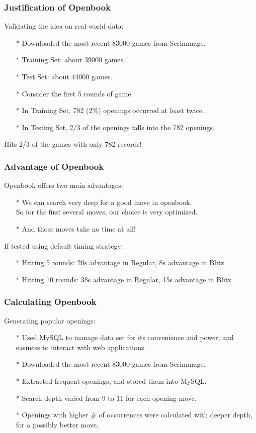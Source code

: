 \documentclass[10pt]{beamer}
\begin{document}
	\begin{frame}
		\frametitle{Justification of Openbook}
		Validating the idea on real-world data:\pause
		\begin{itemize}
		\item[*] Downloaded the most recent 83000 games from Scrimmage.
		\item[*] Training Set: about 39000 games.
		\item[*] Test Set: about 44000 games.
		\pause
		\item[*] Consider the first \textcolor{dred}{5} rounds of game.
		\item[*] In Training Set, \textcolor{fgreen}{782} (\textcolor{fgreen}{2\%}) openings occurred at least \textcolor{fgreen}{twice}.
		\item[*] In Testing Set, \textcolor{fgreen}{2/3} of the openings falls into the 782 openings.
		\end{itemize}
		\pause
		Hits \textcolor{fgreen}{2/3} of the games with only \textcolor{fgreen}{782} records!
	\end{frame}

	\begin{frame}
		\frametitle{Advantage of Openbook}
		Openbook offers two main advantages:
		\begin{itemize}
		\item[*] We can search very deep for a good move in openbook.\\
		         So for the first several moves, our choice is very optimized.
		\item[*] And those moves take no time at all!
		\end{itemize}
		\pause
		If tested using default timing strategy:
		\begin{itemize}
		\item[*] Hitting \textcolor{fgreen}{5} rounds: \textcolor{fgreen}{20s} advantage in Regular, \textcolor{fgreen}{8s} advantage in Blitz.
		\item[*] Hitting \textcolor{fgreen}{10} rounds: \textcolor{fgreen}{38s} advantage in Regular, \textcolor{fgreen}{15s} advantage in Blitz.
		\end{itemize}
	\end{frame}

	\begin{frame}
		\frametitle{Calculating Openbook}
		Generating popular openings:
		\begin{itemize}
		\item[*] Used MySQL to manage data set for its convenience and power,
		and easiness to interact with web applications.
		\item[*] Downloaded the most recent 83000 games from Scrimmage.
		\item[*] Extracted frequent openings, and stored them into MySQL.
		\item[*] Search depth varied from \textcolor{fgreen}{9} to \textcolor{fgreen}{11} for each opening move.
		\item[*] Openings with higher \# of occurrences were calculated with deeper depth, for a possibly better move.
		\end{itemize}
	\end{frame}
\end{document}

